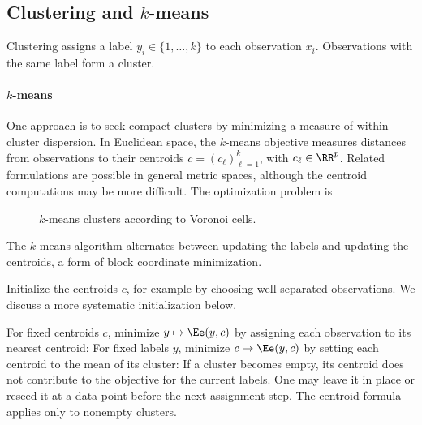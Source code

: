 
 
 

                                                                  
\subsection{Clustering and \texorpdfstring{$k$}{k}-means}

Clustering assigns a label $y_i \in \{1,\ldots,k\}$ to each observation $x_i$. Observations with the same label form a cluster.

    
\paragraph{\texorpdfstring{$k$}{k}-means}

One approach is to seek compact clusters by minimizing a measure of within-cluster dispersion. In Euclidean space, the $k$-means objective measures distances from observations to their centroids $c=(c_\ell)_{\ell=1}^k$, with $c_\ell \in \RR^p$. Related formulations are possible in general metric spaces, although the centroid computations may be more difficult. The optimization problem is

\begin{figure}[tbp]
\centering
{}
\caption{$k$-means clusters according to Voronoi cells.}
\label{fig-review-ml-voronoi}
\end{figure}
The $k$-means algorithm alternates between updating the labels and updating the centroids, a form of block coordinate minimization.
 
Initialize the centroids $c$, for example by choosing well-separated observations. We discuss a more systematic initialization below.
  
For fixed centroids $c$, minimize $y \mapsto \Ee(y,c)$ by assigning each observation to its nearest centroid:
For fixed labels $y$, minimize $c \mapsto \Ee(y,c)$ by setting each centroid to the mean of its cluster:
If a cluster becomes empty, its centroid does not contribute to the objective for the current labels. One may leave it in place or reseed it at a data point before the next assignment step. The centroid formula applies only to nonempty clusters.

